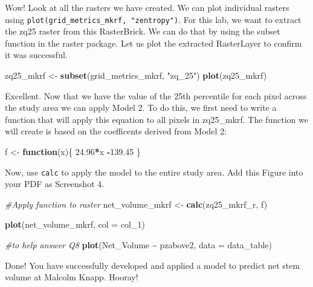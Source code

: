 \documentclass[
]{book}
\newenvironment{Shaded}{\begin{snugshade}}{\end{snugshade}}
\newcommand{\AttributeTok}[1]{\textcolor[rgb]{0.13,0.29,0.53}{#1}}
\newcommand{\CommentTok}[1]{\textcolor[rgb]{0.56,0.35,0.01}{\textit{#1}}}
\newcommand{\ControlFlowTok}[1]{\textcolor[rgb]{0.13,0.29,0.53}{\textbf{#1}}}
\newcommand{\FloatTok}[1]{\textcolor[rgb]{0.00,0.00,0.81}{#1}}
\newcommand{\FunctionTok}[1]{\textcolor[rgb]{0.13,0.29,0.53}{\textbf{#1}}}
\newcommand{\NormalTok}[1]{#1}
\newcommand{\OtherTok}[1]{\textcolor[rgb]{0.56,0.35,0.01}{#1}}
\newcommand{\SpecialCharTok}[1]{\textcolor[rgb]{0.81,0.36,0.00}{\textbf{#1}}}
\newcommand{\StringTok}[1]{\textcolor[rgb]{0.31,0.60,0.02}{#1}}
\begin{document}
Wow! Look at all the rasters we have created. We can plot individual rasters using \texttt{plot(grid\_metrics\_mkrf,\ "zentropy")}. For this lab, we want to extract the zq25 raster from this RasterBrick. We can do that by using the subset function in the raster package. Let us plot the extracted RasterLayer to confirm it was successful.

\begin{Shaded}
\begin{Highlighting}[]
\NormalTok{zq25\_mkrf }\OtherTok{\textless{}{-}} \FunctionTok{subset}\NormalTok{(grid\_metrics\_mkrf, }\StringTok{"zq\_25"}\NormalTok{)}
\FunctionTok{plot}\NormalTok{(zq25\_mkrf)}
\end{Highlighting}
\end{Shaded}

Excellent. Now that we have the value of the 25th percentile for each pixel across the study area we can apply Model 2. To do this, we first need to write a function that will apply this equation to all pixels in zq25\_mkrf. The function we will create is based on the coefficents derived from Model 2:

\begin{Shaded}
\begin{Highlighting}[]
\NormalTok{f }\OtherTok{\textless{}{-}} \ControlFlowTok{function}\NormalTok{(x)\{}
\FloatTok{24.96}\SpecialCharTok{*}\NormalTok{x }\SpecialCharTok{{-}}\FloatTok{139.45}
\NormalTok{\}}
\end{Highlighting}
\end{Shaded}

Now, use \texttt{calc} to apply the model to the entire study area. Add this Figure into your PDF as Screenshot 4.

\begin{Shaded}
\begin{Highlighting}[]
\CommentTok{\#Apply function to raster}
\NormalTok{net\_volume\_mkrf }\OtherTok{\textless{}{-}} \FunctionTok{calc}\NormalTok{(zq25\_mkrf\_r, f)}

\FunctionTok{plot}\NormalTok{(net\_volume\_mkrf, }\AttributeTok{col =}\NormalTok{ col\_1)}

\CommentTok{\#to help answer Q8}
\FunctionTok{plot}\NormalTok{(Net\_Volume }\SpecialCharTok{\textasciitilde{}}\NormalTok{ pzabove2, }\AttributeTok{data =}\NormalTok{ data\_table)}
\end{Highlighting}
\end{Shaded}

Done! You have successfully developed and applied a model to predict net stem volume at Malcolm Knapp. Hooray!
\end{document}
